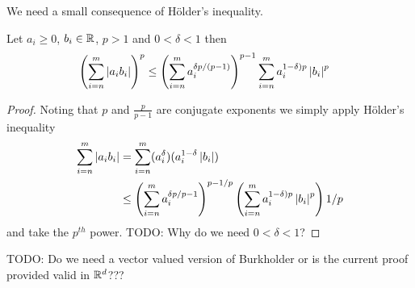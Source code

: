 We need a small consequence of H\"{o}lder's inequality.
\begin{lem}\label{BMPHolderInequality}Let $a_i \geq 0$, $b_i \in \mathbb{R}$, $p > 1$ and $0 < \delta < 1$ then 
\begin{align*}
\left(\sum_{i=n}^m \left \vert  a_i b_i \right \vert \right)^p &\leq \left( \sum_{i=n}^m a_i^{\delta p/(p-1)} \right)^{p-1} \sum_{i=n}^m a_i^{1-\delta)p} \left \vert b_i \right \vert^p
\end{align*}
\end{lem}
\begin{proof}
Noting that $p$ and $\frac{p}{p-1}$ are conjugate exponents we simply apply H\"{o}lder's inequality
\begin{align*}
\sum_{i=n}^m \left \vert a_i b_i \right \vert &= \sum_{i=n}^m (a_i^\delta) (a_i^{1-\delta} \left \vert b_i \right \vert) \\
&\leq \left(\sum_{i=n}^m a_i^{\delta p/p-1} \right )^{p-1/p} \left( \sum_{i=n}^m a_i^{1-\delta)p} \left \vert b_i \right \vert^p \right){1/p}
\end{align*}
and take the $p^{th}$ power.  TODO: Why do we need $0 < \delta < 1$?
\end{proof}

TODO: Do we need a vector valued version of Burkholder or is the current proof provided valid in $\mathbb{R}^d$???

